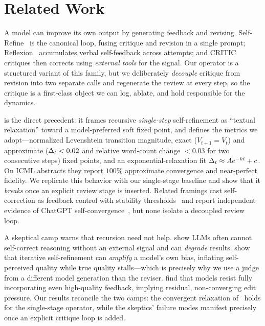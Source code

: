 \section{Related Work}
\label{sec:related}

 A model can improve its own output by generating feedback
and revising. Self-Refine~\citep{madaan2023selfrefine} is the canonical loop, fusing critique
and revision in a single prompt; Reflexion~\citep{shinn2023reflexion} accumulates verbal
self-feedback across attempts; and CRITIC~\citep{gou2023critic} critiques then corrects using
\emph{external tools} for the signal. Our operator is a structured variant of this family,
but we deliberately \emph{decouple} critique from revision into two separate calls and
regenerate the review at every step, so the critique is a first-class object we can log,
ablate, and hold responsible for the dynamics.

 \citet{wu2026converge} is the direct
precedent: it frames recursive \emph{single-step} self-refinement as ``textual relaxation''
toward a model-preferred soft fixed point, and defines the metrics we adopt---normalized
Levenshtein transition magnitude, exact ($V_{t+1}=V_t$) and approximate
($\Delta_t<0.02$ and relative word-count change $<0.03$ for two consecutive steps) fixed points,
and an exponential-relaxation fit $\Delta_t \approx A e^{-kt}+c$. On ICML abstracts they report
$100\%$ approximate convergence and near-perfect fidelity. We replicate this behavior with our
single-stage baseline and show that it \emph{breaks} once an explicit review stage is
inserted. Related framings cast self-correction as feedback control with stability
thresholds~\citep{selfcontrol2026} and report independent evidence of ChatGPT
self-convergence~\citep{xylogiannopoulos2026}, but none isolate a decoupled review loop.

 A skeptical camp warns that recursion need not help.
\citet{huang2023cannot} show LLMs often cannot self-correct reasoning without an external
signal and can \emph{degrade} results. \citet{xu2024pride} show that iterative
self-refinement can \emph{amplify} a model's own bias, inflating self-perceived quality while
true quality stalls---which is precisely why we use a judge from a different model generation
than the reviser. \citet{feedbackfriction2025} find that models resist fully incorporating
even high-quality feedback, implying residual, non-converging edit pressure. Our results
reconcile the two camps: the convergent relaxation of~\citet{wu2026converge} holds for the
single-stage operator, while the skeptics' failure modes manifest precisely once an explicit
critique loop is added.

